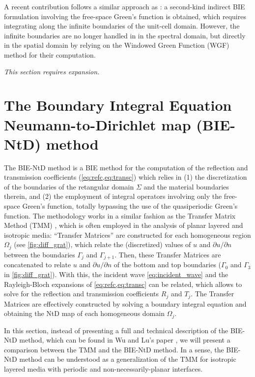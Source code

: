 \documentclass[reprint,amsmath,amssymb,
 aps]{revtex4-2}
\renewcommand{\quote}[1]{``#1''}
\begin{document}
A recent contribution \cite{strauszer2023windowed} follows a similar approach as \cite{barnett2011new,gillman2013fast}: a second-kind indirect
BIE formulation involving the free-space Green’s function is obtained, which requires integrating along the infinite boundaries of the unit-cell domain. However, the infinite boundaries are no longer handled in in the spectral domain, but directly in the spatial domain by relying on the Windowed Green Function (WGF) method \cite{bruno2016windowed} for their computation. 

\textit{This section requires expansion.}

\section{The Boundary Integral Equation Neumann-to-Dirichlet map (BIE-NtD) method}
The BIE-NtD method \cite{wu2009analyzing} is a BIE method for the computation of the reflection and transmission coefficients (\cref{eq:refc,eq:transc}) which relies in (1) the discretization of the boundaries of the retangular domain $\Sigma$ and the material boundaries therein, and (2) the employment of integral operators involving only the free-space Green's function, totally bypassing the use of the quasiperiodic Green's function. The methodology works in a similar fashion as the Transfer Matrix Method (TMM) \cite{born2013principles,heavens1960optical}, which is often employed in the analysis of planar layered and isotropic media: \quote{Transfer Matrices} are constructed for each homogeneous region $\Omega_j$ (see \cref{fig:diff_grat}), which relate the (discretized) values of $u$ and $\partial u/\partial n$ between the boundaries $\Gamma_j$ and $\Gamma_{j+1}$. Then, these Transfer Matrices are concatenated to relate $u$ and $\partial u/\partial n$ of the bottom and top boundaries ($\Gamma_0$ and $\Gamma_3$ in \cref{fig:diff_grat}). With this, the incident wave \cref{eq:incident_wave} and the Rayleigh-Bloch expansions of \cref{eq:refc,eq:transc} can be related, which allows to solve for the reflection and transmission coefficients $R_j$ and $T_j$. The Transfer Matrices are effectively constructed by solving a boundary integral equation and obtaining the NtD map of each homogeneous domain $\Omega_j$.

In this section, instead of presenting a full and technical description of the BIE-NtD method, which can be found in Wu and Lu's paper \cite{wu2009analyzing}, we will present a comparison between the TMM and the BIE-NtD method. In a sense, the BIE-NtD method can be understood as a generalization of the TMM for isotropic layered media with periodic and non-necessarily-planar interfaces.
\end{document}
